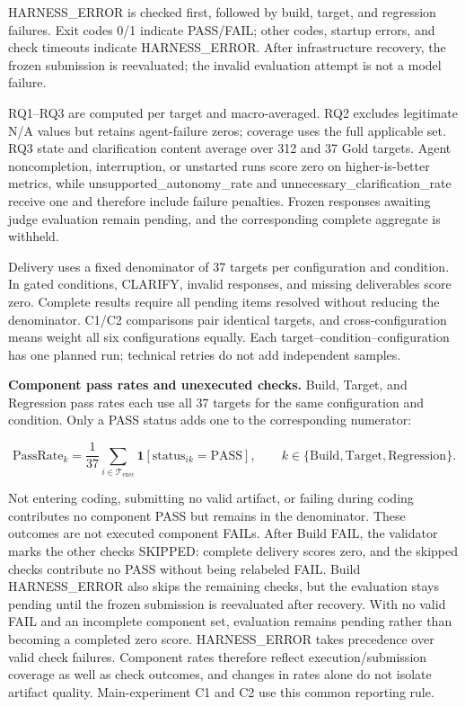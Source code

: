 \documentclass{article} %
\begin{document}
HARNESS\_ERROR is checked first, followed by build, target, and regression failures. Exit codes 0/1 indicate PASS/FAIL; other codes, startup errors, and check timeouts indicate HARNESS\_ERROR. After infrastructure recovery, the frozen submission is reevaluated; the invalid evaluation attempt is not a model failure.

RQ1--RQ3 are computed per target and macro-averaged. RQ2 excludes legitimate N/A values but retains agent-failure zeros; coverage uses the full applicable set. RQ3 state and clarification content average over 312 and 37 Gold targets. Agent noncompletion, interruption, or unstarted runs score zero on higher-is-better metrics, while unsupported\_autonomy\_rate and unnecessary\_clarification\_rate receive one and therefore include failure penalties. Frozen responses awaiting judge evaluation remain pending, and the corresponding complete aggregate is withheld.

Delivery uses a fixed denominator of 37 targets per configuration and condition. In gated conditions, CLARIFY, invalid responses, and missing deliverables score zero. Complete results require all pending items resolved without reducing the denominator. C1/C2 comparisons pair identical targets, and cross-configuration means weight all six configurations equally. Each target--condition--configuration has one planned run; technical retries do not add independent samples.

\textbf{Component pass rates and unexecuted checks.} Build, Target, and Regression pass rates each use all 37 targets for the same configuration and condition. Only a PASS status adds one to the corresponding numerator:

\begin{equation}
\mathrm{PassRate}_{k}=\frac{1}{37}\sum_{i\in\mathcal T_{\mathrm{exec}}}\mathbf 1[\mathrm{status}_{ik}=\mathrm{PASS}],
\qquad k\in\{\mathrm{Build},\mathrm{Target},\mathrm{Regression}\}.
\label{eq:appendix-5}
\end{equation}

Not entering coding, submitting no valid artifact, or failing during coding contributes no component PASS but remains in the denominator. These outcomes are not executed component FAILs. After Build FAIL, the validator marks the other checks SKIPPED: complete delivery scores zero, and the skipped checks contribute no PASS without being relabeled FAIL. Build HARNESS\_ERROR also skips the remaining checks, but the evaluation stays pending until the frozen submission is reevaluated after recovery. With no valid FAIL and an incomplete component set, evaluation remains pending rather than becoming a completed zero score. HARNESS\_ERROR takes precedence over valid check failures. Component rates therefore reflect execution/submission coverage as well as check outcomes, and changes in rates alone do not isolate artifact quality. Main-experiment C1 and C2 use this common reporting rule.
\end{document}
